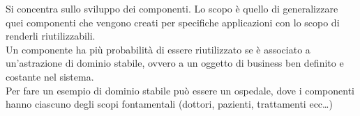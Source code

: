 {    
    \begin{center}
    \end{center}
    \vspace{8pt}

    Si concentra sullo sviluppo dei componenti. Lo scopo è quello di generalizzare quei componenti che vengono creati per 
    specifiche applicazioni con lo scopo di renderli riutilizzabili.
    \\
    Un componente ha più probabilità di essere riutilizzato se è associato a un'astrazione di dominio stabile, ovvero a un oggetto
    di business ben definito e costante nel sistema.
    \\
    Per fare un esempio di dominio stabile può essere un ospedale, dove i componenti hanno ciascuno degli scopi fontamentali 
    (dottori, pazienti, trattamenti ecc\dots)

}
